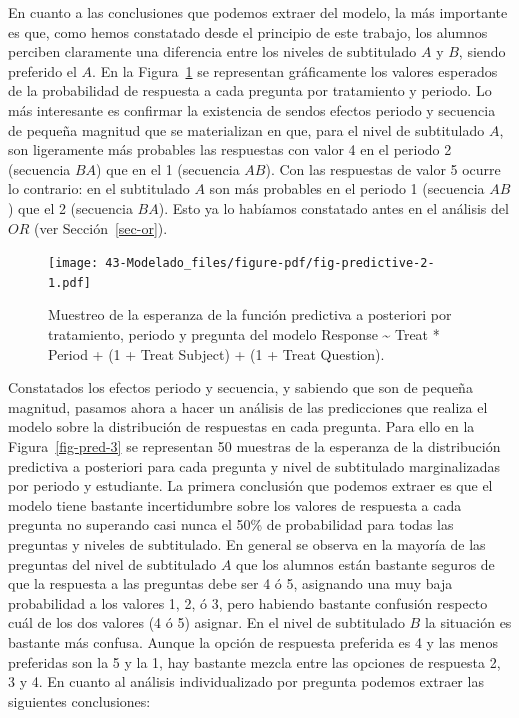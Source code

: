 \documentclass[
  12pt,
  a4paper,
  extrafontsizes,
  onecolumn,
  openright]{memoir}
\begin{document}
En cuanto a las conclusiones que podemos extraer del modelo, la más
importante es que, como hemos constatado desde el principio de este
trabajo, los alumnos perciben claramente una diferencia entre los
niveles de subtitulado \(A\) y \(B\), siendo preferido el \(A\). En la
Figura~\ref{fig-predictive-2} se representan gráficamente los valores
esperados de la probabilidad de respuesta a cada pregunta por
tratamiento y periodo. Lo más interesante es confirmar la existencia de
sendos efectos periodo y secuencia de pequeña magnitud que se
materializan en que, para el nivel de subtitulado \(A\), son ligeramente
más probables las respuestas con valor 4 en el periodo 2 (secuencia
\(BA\)) que en el 1 (secuencia \(AB\)). Con las respuestas de valor 5
ocurre lo contrario: en el subtitulado \(A\) son más probables en el
periodo 1 (secuencia \(AB\)) que el 2 (secuencia \(BA\)). Esto ya lo
habíamos constatado antes en el análisis del \(OR\) (ver
Sección~\ref{sec-or}).

\begin{figure}[h]

{\centering \texttt{[image: 43-Modelado\_files/figure-pdf/fig-predictive-2-1.pdf]}

}

\caption{\label{fig-predictive-2}Muestreo de la esperanza de la función
predictiva a posteriori por tratamiento, periodo y pregunta del modelo
Response \textasciitilde{} Treat * Period + (1 + Treat \textbar{}
Subject) + (1 + Treat \textbar{} Question).}

\end{figure}

Constatados los efectos periodo y secuencia, y sabiendo que son de
pequeña magnitud, pasamos ahora a hacer un análisis de las predicciones
que realiza el modelo sobre la distribución de respuestas en cada
pregunta. Para ello en la Figura~\ref{fig-pred-3} se representan 50
muestras de la esperanza de la distribución predictiva a posteriori para
cada pregunta y nivel de subtitulado marginalizadas por periodo y
estudiante. La primera conclusión que podemos extraer es que el modelo
tiene bastante incertidumbre sobre los valores de respuesta a cada
pregunta no superando casi nunca el 50\% de probabilidad para todas las
preguntas y niveles de subtitulado. En general se observa en la mayoría
de las preguntas del nivel de subtitulado \(A\) que los alumnos están
bastante seguros de que la respuesta a las preguntas debe ser 4 ó 5,
asignando una muy baja probabilidad a los valores 1, 2, ó 3, pero
habiendo bastante confusión respecto cuál de los dos valores (4 ó 5)
asignar. En el nivel de subtitulado \(B\) la situación es bastante más
confusa. Aunque la opción de respuesta preferida es 4 y las menos
preferidas son la 5 y la 1, hay bastante mezcla entre las opciones de
respuesta 2, 3 y 4. En cuanto al análisis individualizado por pregunta
podemos extraer las siguientes conclusiones:
\end{document}

